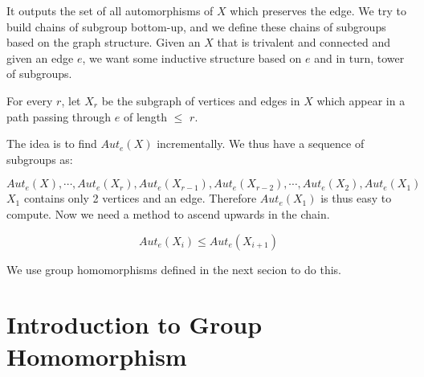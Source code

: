   
 It outputs the set of all automorphisms of  $X$ which preserves the edge. We try to build chains of subgroup bottom-up, and we define these chains of subgroups based on the graph structure. Given an $X$ that is trivalent and connected and given an edge $e$, we want some inductive structure based on $e$ and in turn, tower of subgroups.
  

For every $r$, let $X_r$ be the subgraph of vertices and edges in $X$ which appear in a path passing through $e$ of length $\leqslant$ $r$.


The idea is to find $Aut_e(X)$ incrementally.
We thus have a sequence of subgroups as:

 \[ Aut_e(X),\cdots  ,Aut_e(X_{r}),Aut_e(X_{r-1}),Aut_e(X_{r-2}),\cdots ,Aut_e(X_{2}),Aut_e(X_{1})\]
$X_{1}$ contains only 2 vertices and an edge. Therefore $Aut_e(X_{1})$ is thus easy to compute. Now we need a method to ascend upwards in the chain.
 
 \begin{observation} \[Aut_e(X_i) \leqslant Aut_e(X_{i+1})\]
 \end{observation}
 
 
% 
% 
% 
% 
% 
% 
% 

We use group homomorphisms defined in the next secion to do this.

 \section{Introduction to Group Homomorphism}
 
